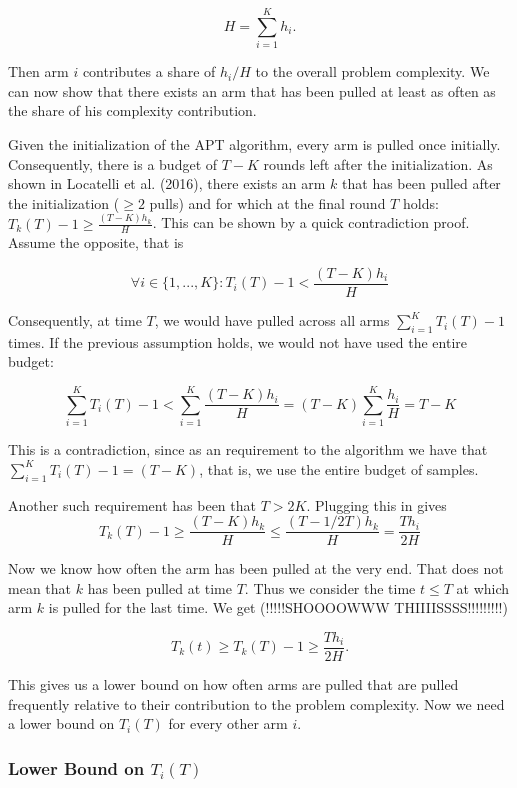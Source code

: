 \documentclass[12pt,]{article}
\begin{document}
\[
H = \sum_{i = 1}^{K} h_i.
\]

Then arm \(i\) contributes a share of \(h_i/H\) to the overall problem
complexity. We can now show that there exists an arm that has been
pulled at least as often as the share of his complexity contribution.

Given the initialization of the APT algorithm, every arm is pulled once
initially. Consequently, there is a budget of \(T-K\) rounds left after
the initialization. As shown in Locatelli et al. (2016), there exists an
arm \(k\) that has been pulled after the initialization (\(\geq 2\)
pulls) and for which at the final round \(T\) holds:
\(T_k(T) - 1 \geq \frac{(T-K)h_k}{H}\). This can be shown by a quick
contradiction proof. Assume the opposite, that is

\[
\forall i \in \{1,...,K\}: T_i(T) - 1 < \frac{(T-K)h_i}{H}
\]

Consequently, at time \(T\), we would have pulled across all arms
\(\sum_{i=1}^KT_i(T)-1\) times. If the previous assumption holds, we
would not have used the entire budget:

\[
\sum_{i=1}^K T_i(T)-1 < \sum_{i=1}^K \frac{(T-K)h_i}{H} = (T-K)\sum_{i=1}^K \frac{h_i}{H} = T-K
\]

This is a contradiction, since as an requirement to the algorithm we
have that \(\sum_{i=1}^K T_i(T)-1 = (T-K)\), that is, we use the entire
budget of samples.

Another such requirement has been that \(T>2K\). Plugging this in gives
\[
T_k(T) - 1 \geq \frac{(T-K)h_k}{H} \leq \frac{(T-1/2T)h_k}{H} = \frac{Th_i}{2H}
\]

Now we know how often the arm has been pulled at the very end. That does
not mean that \(k\) has been pulled at time \(T\). Thus we consider the
time \(t \leq T\) at which arm \(k\) is pulled for the last time. We get
(!!!!!SHOOOOWWW THIIIISSSS!!!!!!!!!)

\[
T_k(t) \geq T_k(T) - 1 \geq \frac{Th_i}{2H}.
\]

This gives us a lower bound on how often arms are pulled that are pulled
frequently relative to their contribution to the problem complexity. Now
we need a lower bound on \(T_i(T)\) for every other arm \(i\).

\subsubsection{\texorpdfstring{Lower Bound on
\(T_i(T)\)}{Lower Bound on T\_i(T)}}\label{lower-bound-on-t_it}
\end{document}
